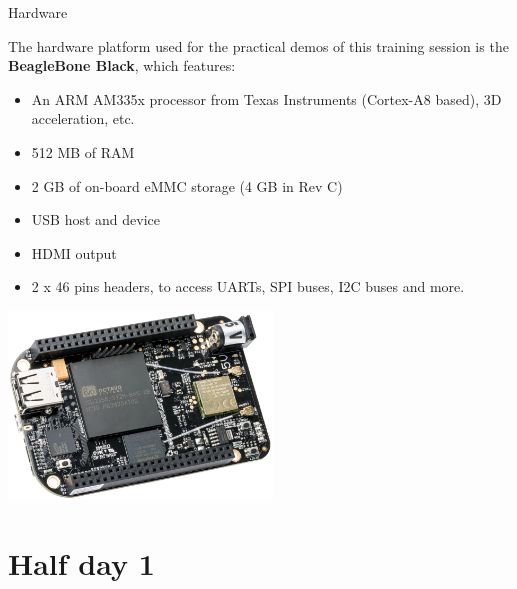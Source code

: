 \documentclass[a4paper,12pt,obeyspaces,spaces,hyphens]{article}
\begin{document}

\feagendatwocolumn
{Hardware}
{
  The hardware platform used for the practical demos of this training
  session is the {\bf BeagleBone Black}, which features:

  \begin{itemize}
  \item An ARM AM335x processor from Texas Instruments (Cortex-A8
    based), 3D acceleration, etc.
  \item 512 MB of RAM
  \item 2 GB of on-board eMMC storage
	\newline(4 GB in Rev C)
  \item USB host and device
  \item HDMI output
  \item 2 x 46 pins headers, to access UARTs, SPI buses, I2C buses
    and more.
  \end{itemize}
}
{}
{
  \begin{center}
    \includegraphics[height=5cm]{../slides/beagleboneblack-board/beagleboneblack.png}
  \end{center}
}

\section{Half day 1}
\end{document}
